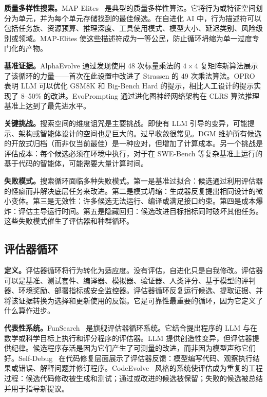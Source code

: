 \textbf{质量多样性搜索。}MAP-Elites~\cite{mouret2015illuminating} 是典型的质量多样性算法。它将行为或特征空间划分为单元，并为每个单元存储找到的最佳候选。在自进化 AI 中，行为描述符可以包括任务族、资源预算、推理深度、工具使用模式、模型大小、延迟类别、风险级别或领域。MAP-Elites 使这些描述符成为一等公民，防止循环坍缩为单一过度专门化的产物。

\textbf{基准证据。}AlphaEvolve 通过发现使用 48 次标量乘法的 $4\times 4$ 复矩阵新算法展示了该循环的力量——首次在此设置中改进了 Strassen 的 49 次乘法算法。OPRO 表明 LLM 可以优化 GSM8K 和 Big-Bench Hard 的提示，相比人工设计的提示实现了 8--50\% 的改进。EvoPrompting 通过进化图神经网络架构在 CLRS 算法推理基准上达到了最先进水平。

\textbf{关键挑战。}搜索空间的维度诅咒是主要挑战。即使有 LLM 引导的变异，可能提示、架构或智能体设计的空间也是巨大的。过早收敛很常见。DGM 维护所有候选的开放式归档（而非仅当前最佳）是一种应对，但增加了计算成本。另一个挑战是评估成本：每个候选必须在环境中执行，对于在 SWE-Bench 等复杂基准上运行的基于代码的智能体，可能需要大量计算时间。

\textbf{失败模式。}搜索循环面临多种失败模式。第一是基准过拟合：候选通过利用评估器的怪癖而非解决底层任务来改进。第二是模式坍缩：生成器反复提出相同设计的微小变体。第三是无效性：许多候选无法运行、编译或满足接口约束。第四是成本爆炸：评估主导运行时间。第五是隐藏回归：候选改进目标指标同时破坏其他任务。这些失败模式催生了评估器和种群循环。

\subsection{评估器循环}\label{sec:ch2-evaluator-loop}

\textbf{定义。}评估器循环将行为转化为适应度。没有评估，自进化只是自我修改。评估器可以是基准、测试套件、编译器、模拟器、验证器、人类评分、基于模型的评判器、环境奖励、部署指标或安全监控器。评估器循环反复运行候选、提取证据、并将该证据转换为选择和更新使用的反馈。它是可靠性最重要的循环，因为它定义了什么算作进步。

\textbf{代表性系统。}FunSearch~\cite{funsearch2024} 是旗舰评估器循环系统。它结合提出程序的 LLM 与在数学或科学目标上执行和评分程序的评估器。LLM 提供创造性变异，但评估器提供纪律。候选程序存活是因为它们产生了可测量的改进，而非因为模型声称它们好。Self-Debug~\cite{singh2023selfdebug} 在代码修复层面展示了评估器反馈：模型编写代码、观察执行结果或错误、解释问题并修订程序。CodeEvolve~\cite{codeevolve2024} 风格的系统使评估成为重复的工程过程：候选代码修改被生成和测试；通过或改进的候选被保留；失败的候选被总结并用于指导新提议。

